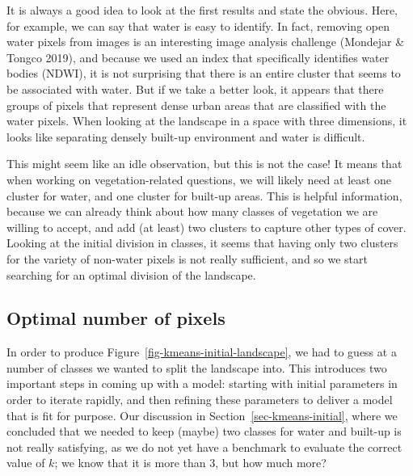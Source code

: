 \documentclass[
  letterpaper,
]{scrbook}
\begin{document}

It is always a good idea to look at the first results and state the
obvious. Here, for example, we can say that water is easy to identify.
In fact, removing open water pixels from images is an interesting image
analysis challenge (Mondejar \& Tongco 2019), and because we used an
index that specifically identifies water bodies (NDWI), it is not
surprising that there is an entire cluster that seems to be associated
with water. But if we take a better look, it appears that there groups
of pixels that represent dense urban areas that are classified with the
water pixels. When looking at the landscape in a space with three
dimensions, it looks like separating densely built-up environment and
water is difficult.

This might seem like an idle observation, but this is not the case! It
means that when working on vegetation-related questions, we will likely
need at least one cluster for water, and one cluster for built-up areas.
This is helpful information, because we can already think about how many
classes of vegetation we are willing to accept, and add (at least) two
clusters to capture other types of cover. Looking at the initial
division in classes, it seems that having only two clusters for the
variety of non-water pixels is not really sufficient, and so we start
searching for an optimal division of the landscape.

\subsection{Optimal number of pixels}\label{optimal-number-of-pixels}


In order to produce Figure~\ref{fig-kmeans-initial-landscape}, we had to
guess at a number of classes we wanted to split the landscape into. This
introduces two important steps in coming up with a model: starting with
initial parameters in order to iterate rapidly, and then refining these
parameters to deliver a model that is fit for purpose. Our discussion in
Section~\ref{sec-kmeans-initial}, where we concluded that we needed to
keep (maybe) two classes for water and built-up is not really
satisfying, as we do not yet have a benchmark to evaluate the correct
value of \(k\); we know that it is more than 3, but how much more?
\end{document}
